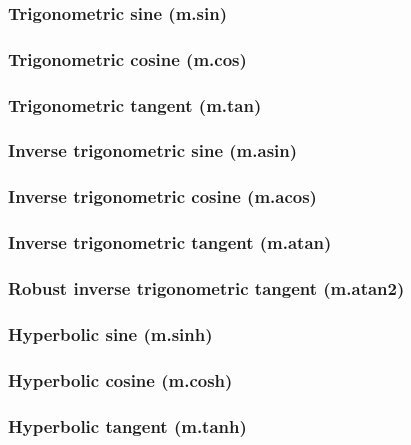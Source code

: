 \documentclass{article}
\theoremstyle{definition}
\begin{document}
\subsubsection{Trigonometric sine (m.sin)}

\subsubsection{Trigonometric cosine (m.cos)}

\subsubsection{Trigonometric tangent (m.tan)}

\subsubsection{Inverse trigonometric sine (m.asin)}

\subsubsection{Inverse trigonometric cosine (m.acos)}

\subsubsection{Inverse trigonometric tangent (m.atan)}

\subsubsection{Robust inverse trigonometric tangent (m.atan2)}

\subsubsection{Hyperbolic sine (m.sinh)}

\subsubsection{Hyperbolic cosine (m.cosh)}

\subsubsection{Hyperbolic tangent (m.tanh)}
\end{document}
